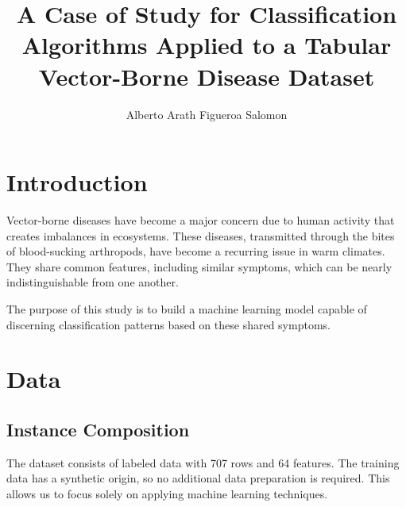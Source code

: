 \documentclass{article}
\title{A Case of Study for Classification Algorithms Applied to a Tabular Vector-Borne Disease Dataset}
\author{Alberto Arath Figueroa Salomon}
\begin{document}
\maketitle

\section{Introduction}

Vector-borne diseases have become a major concern due to human activity that creates imbalances
in ecosystems. These diseases, transmitted through the bites of blood-sucking arthropods, have
become a recurring issue in warm climates. They share common features, including similar symptoms,
which can be nearly indistinguishable from one another.

The purpose of this study is to build a machine learning model capable of discerning classification
patterns based on these shared symptoms.

\section{Data}

\subsection{Instance Composition}

The dataset consists of labeled data with 707 rows and 64 features. The training data has a synthetic origin, so no additional data preparation is required. This allows us to focus solely on applying machine learning techniques.


\begin{table}[h!] %
\centering
\renewcommand{\arraystretch}{1.2} %
\caption{Sample training set with a subset of features.}
\label{tab:sample_training}
\end{table}
\end{document}
